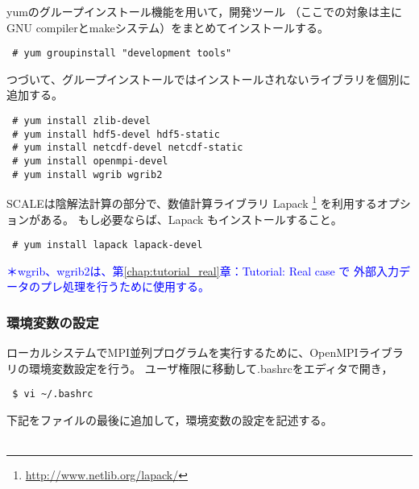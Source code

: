 
\noindent yumのグループインストール機能を用いて，開発ツール
（ここでの対象は主にGNU compilerとmakeシステム）をまとめてインストールする。
\begin{verbatim}
 # yum groupinstall "development tools"
\end{verbatim}

\noindent つづいて、グループインストールではインストールされないライブラリを個別に追加する。
\begin{verbatim}
 # yum install zlib-devel
 # yum install hdf5-devel hdf5-static
 # yum install netcdf-devel netcdf-static
 # yum install openmpi-devel
 # yum install wgrib wgrib2
\end{verbatim}

SCALEは陰解法計算の部分で、数値計算ライブラリ Lapack
\footnote{\url{http://www.netlib.org/lapack/}}
を利用するオプションがある。
もし必要ならば、Lapack もインストールすること。
\begin{verbatim}
 # yum install lapack lapack-devel
\end{verbatim}

\noindent \textcolor{blue}{\small ＊wgrib、wgrib2は、第\ref{chap:tutorial_real}章：Tutorial: Real case で
外部入力データのプレ処理を行うために使用する。}



\subsubsection{環境変数の設定}

ローカルシステムでMPI並列プログラムを実行するために、OpenMPIライブラリの環境変数設定を行う。
ユーザ権限に移動して.bashrcをエディタで開き，
\begin{verbatim}
 $ vi ~/.bashrc
\end{verbatim}
下記をファイルの最後に追加して，環境変数の設定を記述する。\\

\\

